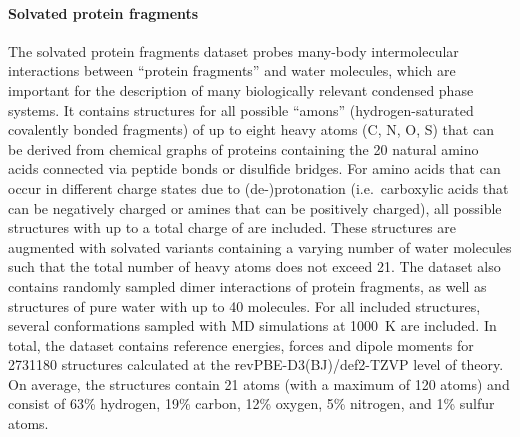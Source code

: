 \documentclass[12pt]{article}
\begin{document}
\paragraph{Solvated protein fragments}
\label{sec:dataset_generation:solvated_protein_fragments}
The solvated protein fragments dataset probes many-body intermolecular
interactions between ``protein fragments'' and water molecules, which
are important for the description of many biologically relevant
condensed phase systems. It contains structures for all possible
``amons''\cite{huang2017chemical} (hydrogen-saturated covalently
bonded fragments) of up to eight heavy atoms (C, N, O, S) that can be
derived from chemical graphs of proteins containing the \num{20}
natural amino acids connected via peptide bonds or disulfide
bridges. For amino acids that can occur in different charge states due
to (de-)protonation (i.e.\ carboxylic acids that can be negatively
charged or amines that can be positively charged), all possible
structures with up to a total charge of  are included. These
structures are augmented with solvated variants containing a varying
number of water molecules such that the total number of heavy atoms
does not exceed \num{21}. The dataset also contains randomly sampled
dimer interactions of protein fragments, as well as structures of pure
water with up to \num{40} molecules. For all included structures,
several conformations sampled with MD simulations at \num{1000}~K are
included. In total, the dataset contains reference energies, forces
and dipole moments for \num{2731180} structures calculated at the
revPBE-D3(BJ)/def2-TZVP level of
theory.\cite{zhang1998comment,grimme2010consistent,grimme2011effect,weigend2005balanced}
On average, the structures contain \num{21} atoms (with a maximum of
\num{120} atoms) and consist of 63\% hydrogen, 19\% carbon, 12\%
oxygen, 5\% nitrogen, and 1\% sulfur atoms.
\end{document}
